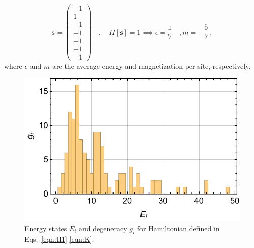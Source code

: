 \documentclass[11pt]{article}
\begin{document}
\begin{equation}
\bm s=\begin{pmatrix}
-1\\ 1\\ -1\\ -1\\ -1\\ -1\\ -1
\end{pmatrix}\quad,\quad H[\bm s]=1\implies \epsilon = \frac{1}{7}\quad, m = -\frac{5}{7}\ ,
\end{equation}
where $\epsilon$ and $m$ are the average energy and magnetization per site, respectively. 
\begin{figure}
\center
\includegraphics[width=.8\columnwidth]{figures/histogram.pdf}
\caption{Energy states $E_i$ and degeneracy $g_i$ for Hamiltonian defined in Eqs.~\eqref{eqn:H1}-\eqref{eqn:K}.\label{fig:histogram}}
\end{figure}
\end{document}
